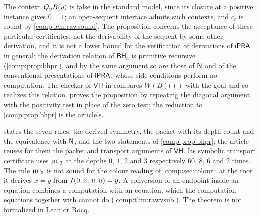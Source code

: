 The context $Q_{y}B(y)$ is false in the standard model, since its closure
at a positive instance gives $0=1$; an open-sequent interface admits such
contexts, and $c_t$ is sound by \cref{comp:lem:rawsound}. The proposition
concerns the acceptance of these particular certificates, not the
derivability of the sequent by some other derivation, and it is not a lower
bound for the verification of derivations of $\mathsf{iPRA}$ in general: the
derivation relation of $\mathsf{BH}_3$ is primitive recursive
(\cref{comp:prop:bhpr}), and by the same argument so are those of $\mathsf{N}$ and
of the conventional presentations of $\mathsf{iPRA}$, whose side conditions perform
no computation. The
checker of $\mathsf{VH}$ in  compares $W(B(t))$ with
the goal and so realizes this relation.  proves the
proposition by repeating the diagonal argument with the positivity test in
place of the zero test; the reduction to \cref{comp:prop:bhpr} is the
article's.

\begin{remark}
\label{comp:rem:bh}
 states the seven rules, the derived symmetry, the packet
with its depth count and the equivalence with $\mathsf{N}$, and the two
statements of \cref{comp:prop:bhpr}; the article reuses for them the packet
and transport arguments of $\mathsf{VH}$. Its symbolic transport certificate
uses $\rulename{HC}_3$ at the depths $0$, $1$, $2$ and $3$ respectively $60$,
$8$, $6$ and $2$ times. The rule $\rulename{HC}_3$ is not sound for the
colour reading of \cref{comp:sec:colour}: at the root it derives
$x=y$ from $I(0,x;\,u.\,u)=y$. A conversion of an endpoint inside an
equation combines a computation with an equation, which the computation
equations together with  cannot do
(\cref{comp:thm:rawvsub}). The theorem is not formalized in Lean or Rocq.
\end{remark}

